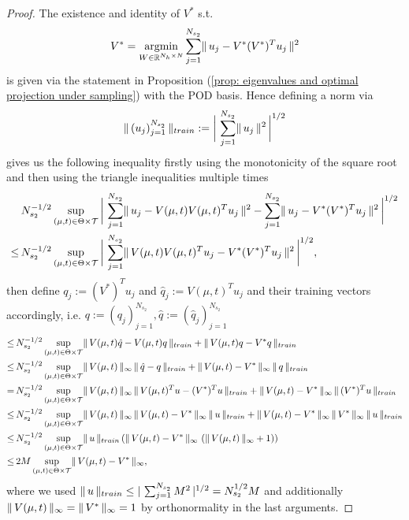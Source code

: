 \begin{proof}
    The existence and identity of $V^*$ s.t. 
    \begin{equation*}
        V^* = \underset{W \in \mathbb{R}^{N_h \times N}}{\operatorname{argmin}} \sum_{j=1}^{N_{s_2}}
        \lVert \, u_j - V^* (V^*)^T u_j \, \rVert^2    
    \end{equation*}
    is given via the statement in Proposition (\ref{prop: eigenvalues and optimal projection under sampling}) with the POD basis.
    Hence defining a norm via 
    \begin{equation*}
        \lVert \, (u_j)_{j=1}^{N_{s_2}} \, \rVert_{train} := \bigg\vert \, \sum_{j=1}^{N_{s_2}} \lVert \, u_j \, \rVert^2 \, \bigg\vert^{1/2}
    \end{equation*}
    gives us the following inequality firstly using the monotonicity of the square root and then using the triangle inequalities multiple times
    \begin{align*}
        & \, N_{s_2}^{-1/2} \sup\limits_{(\mu, t) \in \Theta \times \mathcal{T}} \bigg\vert \, \sum_{j=1}^{N_{s_2}} \lVert \, u_j - V(\mu, t) V(\mu, t)^T u_j \, \rVert^2 
        - \sum_{j = 1}^{N_{s_2}} \lVert \, u_j - V^* (V^*)^T u_j \, \rVert^2 \, \bigg\vert^{1/2} \\
        \leq& \, N_{s_2}^{-1/2} \sup\limits_{(\mu, t) \in \Theta \times \mathcal{T}} \bigg\vert \, \sum_{j = 1}^{N_{s_2}} \lVert \, V(\mu, t) V(\mu, t)^T u_j - V^* (V^*)^T u_j \, \rVert^2 \, \bigg\vert^{1/2}, 
    \end{align*}
    then define $q_j := (V^*)^T u_j$ and $\hat{q}_j := V(\mu, t)^T u_j$ and their training vectors accordingly, i.e. $q := (q_j)_{j=1}^{N_{s_2}}, \hat{q} := (\hat{q}_j)_{j=1}^{N_{s_2}}$
    \begin{align*}
        \leq& \, N_{s_2}^{-1/2} \sup\limits_{(\mu, t) \in \Theta \times \mathcal{T}} \lVert \, V(\mu, t) \hat{q} - V(\mu, t) q \, \rVert_{train} + \lVert \, V(\mu, t) q - V^* q \, \rVert_{train} \\
        \leq& \, N_{s_2}^{-1/2} \sup\limits_{(\mu, t) \in \Theta \times \mathcal{T}}  \lVert \, V(\mu, t) \, \rVert_\infty \, \lVert \, \hat{q} - q \, \rVert_{train} + \lVert \, V(\mu, t) - V^* \, \rVert_\infty \, \lVert \, q \, \rVert_{train} \\
        = & \, N_{s_2}^{-1/2} \sup\limits_{(\mu, t) \in \Theta \times \mathcal{T}} \lVert \, V(\mu, t) \, \rVert_\infty \, \lVert \, V(\mu, t)^T u - (V^*)^T u \, \rVert_{train} + \lVert \, V(\mu, t) - V^* \, \rVert_\infty \, \lVert \, (V^*)^T u \, \rVert_{train} \\
        \leq& \, N_{s_2}^{-1/2}  \sup\limits_{(\mu, t) \in \Theta \times \mathcal{T}} \lVert \, V(\mu, t) \, \rVert_\infty \, \lVert \, V(\mu, t) - V^* \, \rVert_\infty \, \lVert \, u \, \rVert_{train} + \lVert \, V(\mu, t) - V^* \, \rVert_\infty \, \lVert \, V^* \, \rVert_\infty \, \lVert \, u \, \rVert_{train} \\
        \leq& \, N_{s_2}^{-1/2}  \sup\limits_{(\mu, t) \in \Theta \times \mathcal{T}} \lVert \, u \, \rVert_{train} \left( \lVert \, V(\mu, t) - V^* \, \rVert_\infty \, \left( \lVert \, V(\mu, t) \, \rVert_\infty + 1 \right) \right) \\
        \leq& \, 2 M \sup\limits_{(\mu, t) \in \Theta \times \mathcal{T}} \lVert \, V(\mu, t) - V^* \, \rVert_\infty,
    \end{align*}
    where we used $\lVert \, u \, \rVert_{train} \leq \vert \, \sum_{j=1}^{N_{s_2}} M^2 \, \vert^{1/2} = N_{s_2}^{1/2} M$ and additionally $\lVert \, V(\mu, t) \, \rVert_\infty = \lVert \, V^* \, \rVert_\infty = 1$
    by orthonormality in the last arguments.


\end{proof}
